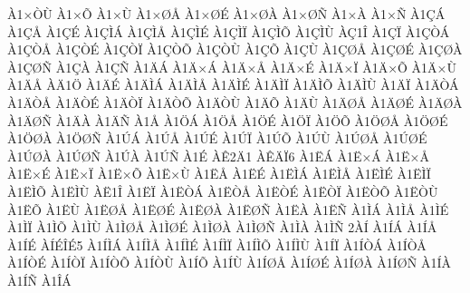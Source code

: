 {^^c01^^d7^^d2^^d9
^^c01^^d7^^d5
^^c01^^d7^^d9
^^c01^^d7^^d8^^c5
^^c01^^d7^^d8^^c9
^^c01^^d7^^d8^^c0
^^c01^^d7^^d8^^d1
^^c01^^d7^^c0
^^c01^^d7^^d1
^^c01^^c7^^c1
^^c01^^c7^^c5
^^c01^^c7^^c9
^^c01^^c7^^cc^^c1
^^c01^^c7^^cc^^c5
^^c01^^c7^^cc^^c9
^^c01^^c7^^cc^^cf
^^c01^^c7^^cc^^d5
^^c01^^c7^^cc^^d9
^^c0^^c71^^ce
^^c01^^c7^^cf
^^c01^^c7^^d2^^c1
^^c01^^c7^^d2^^c5
^^c01^^c7^^d2^^c9
^^c01^^c7^^d2^^cf
^^c01^^c7^^d2^^d5
^^c01^^c7^^d2^^d9
^^c01^^c7^^d5
^^c01^^c7^^d9
^^c01^^c7^^d8^^c5
^^c01^^c7^^d8^^c9
^^c01^^c7^^d8^^c0
^^c01^^c7^^d8^^d1
^^c01^^c7^^c0
^^c01^^c7^^d1
^^c01^^c4^^c1
^^c01^^c4^^d7^^c1
^^c01^^c4^^d7^^c5
^^c01^^c4^^d7^^c9
^^c01^^c4^^d7^^cf
^^c01^^c4^^d7^^d5
^^c01^^c4^^d7^^d9
^^c01^^c4^^c5
^^c0^^c41^^d6
^^c01^^c4^^c9
^^c01^^c4^^cc^^c1
^^c01^^c4^^cc^^c5
^^c01^^c4^^cc^^c9
^^c01^^c4^^cc^^cf
^^c01^^c4^^cc^^d5
^^c01^^c4^^cc^^d9
^^c01^^c4^^cf
^^c01^^c4^^d2^^c1
^^c01^^c4^^d2^^c5
^^c01^^c4^^d2^^c9
^^c01^^c4^^d2^^cf
^^c01^^c4^^d2^^d5
^^c01^^c4^^d2^^d9
^^c01^^c4^^d5
^^c01^^c4^^d9
^^c01^^c4^^d8^^c5
^^c01^^c4^^d8^^c9
^^c01^^c4^^d8^^c0
^^c01^^c4^^d8^^d1
^^c01^^c4^^c0
^^c01^^c4^^d1
^^c01^^c5
^^c01^^d6^^c1
^^c01^^d6^^c5
^^c01^^d6^^c9
^^c01^^d6^^cf
^^c01^^d6^^d5
^^c01^^d6^^d8^^c5
^^c01^^d6^^d8^^c9
^^c01^^d6^^d8^^c0
^^c01^^d6^^d8^^d1
^^c01^^da^^c1
^^c01^^da^^c5
^^c01^^da^^c9
^^c01^^da^^cf
^^c01^^da^^d5
^^c01^^da^^d9
^^c01^^da^^d8^^c5
^^c01^^da^^d8^^c9
^^c01^^da^^d8^^c0
^^c01^^da^^d8^^d1
^^c01^^da^^c0
^^c01^^da^^d1
^^c01^^c9
^^c0^^ca2^^c41
^^c0^^ca^^c4^^cf6
^^c01^^cb^^c1
^^c01^^cb^^d7^^c1
^^c01^^cb^^d7^^c5
^^c01^^cb^^d7^^c9
^^c01^^cb^^d7^^cf
^^c01^^cb^^d7^^d5
^^c01^^cb^^d7^^d9
^^c01^^cb^^c5
^^c01^^cb^^c9
^^c01^^cb^^cc^^c1
^^c01^^cb^^cc^^c5
^^c01^^cb^^cc^^c9
^^c01^^cb^^cc^^cf
^^c01^^cb^^cc^^d5
^^c01^^cb^^cc^^d9
^^c0^^cb1^^ce
^^c01^^cb^^cf
^^c01^^cb^^d2^^c1
^^c01^^cb^^d2^^c5
^^c01^^cb^^d2^^c9
^^c01^^cb^^d2^^cf
^^c01^^cb^^d2^^d5
^^c01^^cb^^d2^^d9
^^c01^^cb^^d5
^^c01^^cb^^d9
^^c01^^cb^^d8^^c5
^^c01^^cb^^d8^^c9
^^c01^^cb^^d8^^c0
^^c01^^cb^^d8^^d1
^^c01^^cb^^c0
^^c01^^cb^^d1
^^c01^^cc^^c1
^^c01^^cc^^c5
^^c01^^cc^^c9
^^c01^^cc^^cf
^^c01^^cc^^d5
^^c01^^cc^^d9
^^c01^^cc^^d8^^c5
^^c01^^cc^^d8^^c9
^^c01^^cc^^d8^^c0
^^c01^^cc^^d8^^d1
^^c01^^cc^^c0
^^c01^^cc^^d1
2^^c0^^cd
^^c01^^cd^^c1
^^c01^^cd^^c5
^^c01^^cd^^c9
^^c0^^cd^^c9^^ce^^c95
^^c01^^cd^^cc^^c1
^^c01^^cd^^cc^^c5
^^c01^^cd^^cc^^c9
^^c01^^cd^^cc^^cf
^^c01^^cd^^cc^^d5
^^c01^^cd^^cc^^d9
^^c01^^cd^^cf
^^c01^^cd^^d2^^c1
^^c01^^cd^^d2^^c5
^^c01^^cd^^d2^^c9
^^c01^^cd^^d2^^cf
^^c01^^cd^^d2^^d5
^^c01^^cd^^d2^^d9
^^c01^^cd^^d5
^^c01^^cd^^d9
^^c01^^cd^^d8^^c5
^^c01^^cd^^d8^^c9
^^c01^^cd^^d8^^c0
^^c01^^cd^^d8^^d1
^^c01^^cd^^c0
^^c01^^cd^^d1
^^c01^^ce^^c1
}
